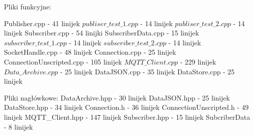 Pliki funkcyjne:

Publisher.cpp - 41 linijek 
$publiser\_test\_1.cpp$ - 14 linijek 
$publiser\_test\_2.cpp$ - 14 linijek 
Subscriber.cpp - 54 linijki
SubscriberData.cpp - 15 linijek
$subscriber\_test\_1.cpp$ - 14 linijek 
$subscriber\_test\_2.cpp$ - 14 linijek 
SocketHandle.cpp - 48 linijek
Connection.cpp - 25 linijek 
ConnectionUnscripted.cpp - 105 linijek 
$MQTT\_Client.cpp$ - 229 linijek 
$Data\_Archive.cpp$ - 25 linijek
DataJSON.cpp - 35 linijek 
DataStore.cpp - 25 linijek 

Pliki nagłówkowe:
DataArchive.hpp - 30 linijek 
DataJSON.hpp - 25 linijek 
DataStore.hpp - 34 linijek 
Connection.h - 36 linijek 
ConnectionUnscripted.h - 49 linijek 
MQTT_Client.hpp - 147 linijek 
Subscriber.hpp - 15 linijek 
SubcriberData - 8 linijek 